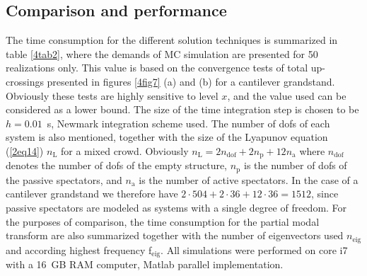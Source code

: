 \documentclass[preprint,12pt,authoryear]{elsarticle}
\begin{document}
\subsection{Comparison and performance}
\label{performance}
The time consumption for the different solution techniques is summarized in table \ref{4tab2}, where the demands of MC simulation are presented for 50 realizations only. This value is based on the convergence tests of total up-crossings presented in figures \ref{4fig7} (a) and (b) for a cantilever grandstand. Obviously these tests are highly sensitive to level $x$, and the  value used can be considered as a lower bound. The size of the time integration step is chosen to be $h=0.01$~s, Newmark integration scheme used. The number of dofs of each system is also mentioned, together with the size of the Lyapunov equation (\ref{2eq14}) $n_\mathrm{L}$ for a mixed crowd. Obviously $n_\mathrm{L}=2n_{\mathrm{dof}}+2n_{\mathrm{p}}+12n_{\mathrm{a}}$ where $n_{\mathrm{dof}}$ denotes the number of dofs of the empty structure, $n_{\mathrm{p}}$ is the number of dofs of the passive spectators, and $n_{\mathrm{a}}$ is the number of active spectators. In the case of a cantilever grandstand we therefore have $2\cdot 504+2\cdot 36+12\cdot 36=1512$, since passive spectators are modeled as systems with a single degree of freedom. For the purposes of comparison, the time consumption for the partial modal transform are also summarized together with the number of eigenvectors used $n_{\mathrm{eig}}$ and according highest frequency f$_{\mathrm{eig}}$. All simulations were performed on core i7 with a 16~GB RAM computer, Matlab\textsuperscript{\textregistered} parallel implementation.
\end{document}
